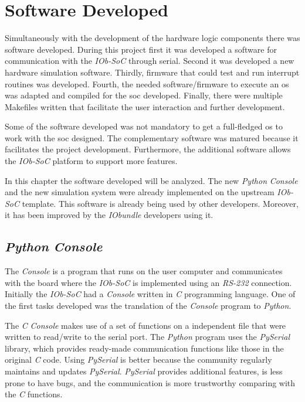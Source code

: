 \chapter{Software Developed}
\label{chapter:software_developed}
Simultaneously with the development of the hardware logic components there was software developed. During this project first it was developed a software for communication with the \textit{IOb-SoC} through serial. Second it was developed a new hardware simulation software. Thirdly, firmware that could test and run interrupt routines was developed. Fourth, the needed software/firmware to execute an \acrlong{os} was adapted and compiled for the \acrshort{soc} developed. Finally, there were multiple Makefiles written that facilitate the user interaction and further development.

Some of the software developed was not mandatory to get a full-fledged \acrlong{os} to work with the \acrlong{soc} designed. The complementary software was matured because it facilitates the project development. Furthermore, the additional software allows the \textit{IOb-SoC} platform to support more features.

In this chapter the software developed will be analyzed. The new \textit{Python} \textit{Console} and the new simulation system were already implemented on the upstream \textit{IOb-SoC} template. This software is already being used by other developers. Moreover, it has been improved by the \textit{IObundle} developers using it.

\section{\textit{Python} \textit{Console}}
\label{section:pyhton_console}
The \textit{Console} is a program that runs on the user computer and communicates with the board where the \textit{IOb-SoC} is implemented using an \textit{RS-232} connection. Initially the \textit{IOb-SoC} had a \textit{Console} written in \textit{C} programming language. One of the first tasks developed was the translation of the \textit{Console} program to \textit{Python}.

The \textit{C} \textit{Console} makes use of a set of functions on a independent file that were written to read/write to the serial port. The \textit{Python} program uses the \textit{PySerial} library, which provides ready-made communication functions like those in the original \textit{C} code. Using \textit{PySerial} is better because the community regularly maintains and updates \textit{PySerial}. \textit{PySerial} provides additional features, is less prone to have bugs, and the communication is more trustworthy comparing with the \textit{C} functions.

